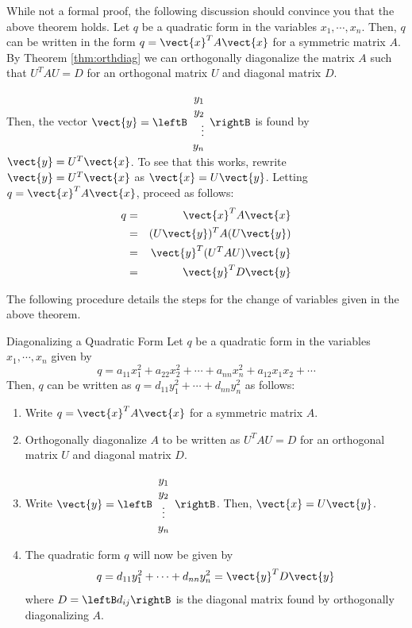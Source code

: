 While not a formal proof, the following discussion should convince you that the above theorem holds. Let $q$ be a quadratic form in the variables $x_1, \cdots, x_n$. Then, $q$ can be written in the form $q = \vect{x}^T A \vect{x}$ for a symmetric matrix $A$.  
By Theorem \ref{thm:orthdiag} we can orthogonally diagonalize the matrix $A$ such that $U^TAU = D$ for an orthogonal matrix $U$ and diagonal matrix $D$. 

Then, the vector $\vect{y} = \leftB \begin{array}{r}
y_1 \\
y_2 \\
\vdots \\
y_n
\end{array}
\rightB
$ is found by $\vect{y} = U^T \vect{x}$. To see that this works, rewrite $\vect{y} = U^T \vect{x}$ as $\vect{x} = U\vect{y}$. Letting $q = \vect{x}^TA\vect{x}$, proceed as follows:
\begin{eqnarray*}
q &=& \vect{x}^T A \vect{x}\\
&=& (U\vect{y})^T A (U\vect{y})\\
&=& \vect{y}^T (U^TAU) \vect{y} \\
&=& \vect{y}^T D \vect{y}
\end{eqnarray*}

The following procedure details the steps for the change of variables given in the above theorem. 

\begin{procedure}{Diagonalizing a Quadratic Form}\label{proc:diagquadraticform}
Let $q$ be a quadratic form in the variables $x_1, \cdots, x_n$ given by 
\[
q = a_{11}x_1^2 + a_{22}x_2^2 + \cdots + a_{nn}x_n^2 + a_{12}x_1x_2+\cdots
\]
Then, $q$ can be written as $q = d_{11}y_1^2 + \cdots + d_{nn}y_n^2$ as follows:

\begin{enumerate}
\item
Write $q = \vect{x}^T A \vect{x}$ for a symmetric matrix $A$. 

\item
Orthogonally diagonalize $A$ to be written as $U^TAU=D$ for an orthogonal matrix $U$ and diagonal matrix $D$. 

\item
Write $\vect{y} = \leftB \begin{array}{c}
y_1 \\
y_2 \\
\vdots \\
y_n
\end{array}
\rightB$. Then, $\vect{x} = U \vect{y}$. 

\item 
The quadratic form $q$ will now be given by 
\[
q = d_{11}y_1^2 + \cdots + d_{nn}y_n^2 = \vect{y}^T D \vect{y}
\]
where $D = \leftB d_{ij} \rightB$ is the diagonal matrix found by orthogonally diagonalizing $A$. 
\end{enumerate}
\end{procedure}

